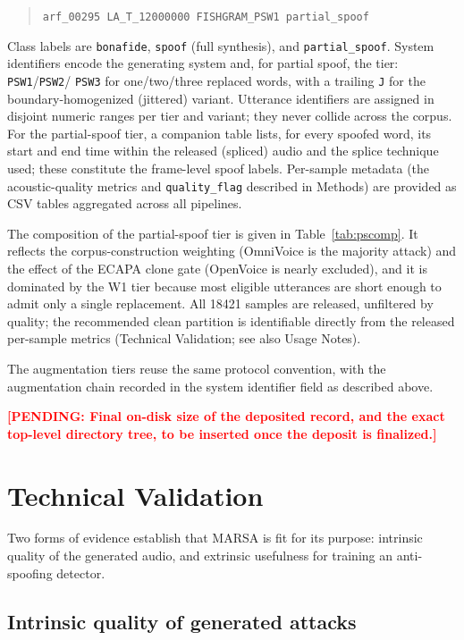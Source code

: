 \documentclass[11pt]{article}
\newcommand{\PENDING}[1]{\textcolor{red}{\textbf{[PENDING: #1]}}}
\begin{document}
\begin{quote}\small
\texttt{arf\_00295\ LA\_T\_12000000\ FISHGRAM\_PSW1\ partial\_spoof}
\end{quote}

Class labels are \texttt{bonafide}, \texttt{spoof} (full synthesis), and
\texttt{partial\_spoof}. System identifiers encode the generating system
and, for partial spoof, the tier: \texttt{PSW1}/\texttt{PSW2}/%
\texttt{PSW3} for one/two/three replaced words, with a trailing
\texttt{J} for the boundary-homogenized (jittered) variant. Utterance
identifiers are assigned in disjoint numeric ranges per tier and
variant; they never collide across the corpus. For the
partial-spoof tier, a companion table lists, for every spoofed word, its
start and end time within the released (spliced) audio and the splice
technique used; these constitute the frame-level spoof labels. Per-sample
metadata (the acoustic-quality metrics and \texttt{quality\_flag}
described in Methods) are provided as CSV tables aggregated across all
pipelines.

The composition of the partial-spoof tier is given in
Table~\ref{tab:pscomp}. It reflects the corpus-construction weighting
(OmniVoice is the majority attack) and the effect of the ECAPA clone
gate (OpenVoice is nearly excluded), and it is dominated by the W1 tier
because most eligible utterances are short enough to admit only a
single replacement. All 18421 samples are released, unfiltered by
quality; the recommended clean partition is identifiable directly from
the released per-sample metrics (Technical Validation; see also Usage
Notes).

The augmentation tiers reuse the same protocol convention, with the
augmentation chain recorded in the system identifier field as described
above.

\PENDING{Final on-disk size of the deposited record, and the exact
top-level directory tree, to be inserted once the deposit is finalized.}

\section*{Technical Validation}

Two forms of evidence establish that MARSA is fit for its purpose:
intrinsic quality of the generated audio, and extrinsic usefulness for
training an anti-spoofing detector.

\subsection*{Intrinsic quality of generated attacks}
\end{document}
